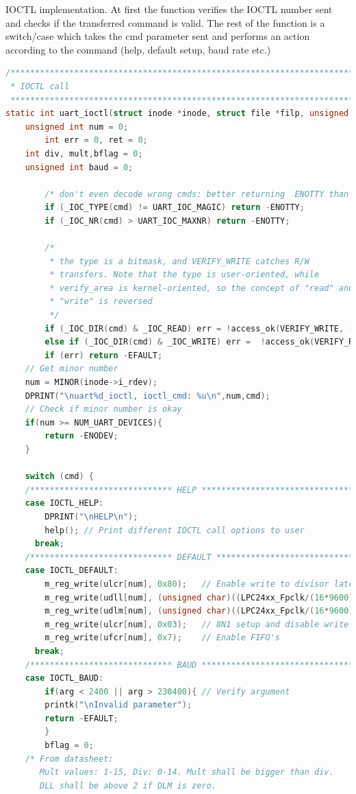 IOCTL implementation. At first the function verifies the IOCTL number sent and checks if the transferred command is valid. The rest of the function is a  switch/case which takes the cmd parameter sent and performs an action according to the command (help, default setup, baud rate etc.)
\begin{lstlisting}[language=c]
/******************************************************************************
 * IOCTL call
 *****************************************************************************/
static int uart_ioctl(struct inode *inode, struct file *filp, unsigned int cmd, unsigned long arg){
	unsigned int num = 0;
        int err = 0, ret = 0;
	int div, mult,bflag = 0;
	unsigned int baud = 0;

        /* don't even decode wrong cmds: better returning  ENOTTY than EFAULT */
        if (_IOC_TYPE(cmd) != UART_IOC_MAGIC) return -ENOTTY;
        if (_IOC_NR(cmd) > UART_IOC_MAXNR) return -ENOTTY;

        /*
         * the type is a bitmask, and VERIFY_WRITE catches R/W
         * transfers. Note that the type is user-oriented, while
         * verify_area is kernel-oriented, so the concept of "read" and
         * "write" is reversed
         */
        if (_IOC_DIR(cmd) & _IOC_READ) err = !access_ok(VERIFY_WRITE, (void __user *)arg, _IOC_SIZE(cmd));
        else if (_IOC_DIR(cmd) & _IOC_WRITE) err =  !access_ok(VERIFY_READ, (void __user *)arg, _IOC_SIZE(cmd));
        if (err) return -EFAULT;
	// Get minor number
	num = MINOR(inode->i_rdev);
	DPRINT("\nuart%d_ioctl, ioctl_cmd: %u\n",num,cmd);
	// Check if minor number is okay
	if(num >= NUM_UART_DEVICES){
		return -ENODEV;
	}

	switch (cmd) {
	/***************************** HELP ************************************************/
	case IOCTL_HELP:
	    DPRINT("\nHELP\n");
	    help();	// Print different IOCTL call options to user
	  break;
	/***************************** DEFAULT *********************************************/
	case IOCTL_DEFAULT:
	    m_reg_write(ulcr[num], 0x80);	// Enable write to divisor latch
	    m_reg_write(udll[num], (unsigned char)((LPC24xx_Fpclk/(16*9600)) & 0xFF));
	    m_reg_write(udlm[num], (unsigned char)((LPC24xx_Fpclk/(16*9600)) >> 8));
	    m_reg_write(ulcr[num], 0x03);	// 8N1 setup and disable write to divisor latch
	    m_reg_write(ufcr[num], 0x7);	// Enable FIFO's
	  break;
	/***************************** BAUD ************************************************/
	case IOCTL_BAUD:
	    if(arg < 2400 || arg > 230400){	// Verify argument
		printk("\nInvalid parameter");
		return -EFAULT;
	    }
	    bflag = 0;	
	/* From datasheet:
	   Mult values: 1-15, Div: 0-14. Mult shall be bigger than div.
	   DLL shall be above 2 if DLM is zero.


\end{lstlisting}

